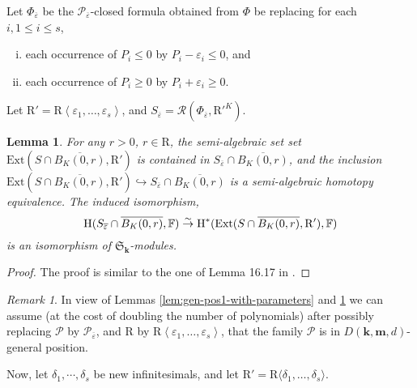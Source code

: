 \documentclass{amsart}
\newtheorem{lemma}{Lemma}
\theoremstyle{definition}
\theoremstyle{remark}
\newtheorem{remark}{Remark}
\numberwithin{equation}{section}
\begin{document}
Let $\Phi_{\overline{{\varepsilon}}}$ be the
$\mathcal{P}_{\overline{{\varepsilon}}}$-closed formula obtained from $\Phi$ be
replacing for each $i,1 \leq i \leq s$,
\begin{enumerate}[i.]
  \item each occurrence of $P_{i} \leq 0$ by $P_{i} - {{\varepsilon}}_{i} \leq 0
  $, and
  
  \item each occurrence of $P_{i} \geq 0$ by $P_{i} + {{\varepsilon}}_{i} \geq 0
  $.
\end{enumerate}
Let ${\mathrm{R}}' = {\mathrm{R}} \left\langle {{\varepsilon}}_{1} , \ldots , {{\varepsilon}}_{s} \right\rangle$, and 
$S_{\overline{{\varepsilon}}} = {{\mathcal R}}(\Phi_{\overline{{\varepsilon}}} , {\mathrm{R}}'^{K})$.

\begin{lemma}
  \label{lem:gen-pos2-with-parameters} For any $r>0$, $r \in {\mathrm{R}}$, the
  semi-algebraic set set ${\mathrm{Ext}} (S \cap \overline{B_{K} (0,r)} , {\mathrm{R}}')$ is contained in 
  $S_{\overline{{\varepsilon}}} \cap \overline{B_{K} (0,r)}$, and the inclusion 
  ${\mathrm{Ext}}(S \cap \overline{B_{K} (0,r)} , {\mathrm{R}}') \hookrightarrow S_{\overline{{\varepsilon}}} \cap
  \overline{B_{K} (0,r)}$ is a semi-algebraic homotopy equivalence.
  The induced isomorphism,
  \[
  {\mbox{\rm H}}(S_{\overline{{\varepsilon}}} \cap \overline{B_{K} (0,r)},{\mathbb{F}}) \overset{\sim}{\rightarrow} {\mbox{\rm H}}^*({\mathrm{Ext}}(S \cap \overline{B_{K} (0,r)} , {\mathrm{R}}'),{\mathbb{F}}) 
  \]
  is an isomorphism of $\mathfrak{S}_{\mathbf{k}}$-modules.
\end{lemma}

\begin{proof} The proof is similar to the one of Lemma 16.17 in
{\cite{BPRbook2}}.
\end{proof}

\begin{remark}
  \label{rem:gen-pos3} In view of Lemmas \ref{lem:gen-pos1-with-parameters} and
  \ref{lem:gen-pos2-with-parameters} we can assume (at the cost of doubling the number of
  polynomials) after possibly replacing $\mathcal{P}$ by
  $\mathcal{P}_{\overline{{\varepsilon}}}$, and ${\mathrm{R}}$ by ${\mathrm{R}} \left\langle {{\varepsilon}}_{1} ,
  \ldots , {{\varepsilon}}_{s} \right\rangle$, that the family $\mathcal{P}$ is in
  $D(\mathbf{k},\mathbf{m},d)$-general position.
\end{remark}

Now, let $\delta_{1} , \cdots , \delta_{s}$ be new infinitesimals, and let
${\mathrm{R}}' = {\mathrm{R}} \langle \delta_{1} , \ldots , \delta_{s} \rangle$.
\end{document}
